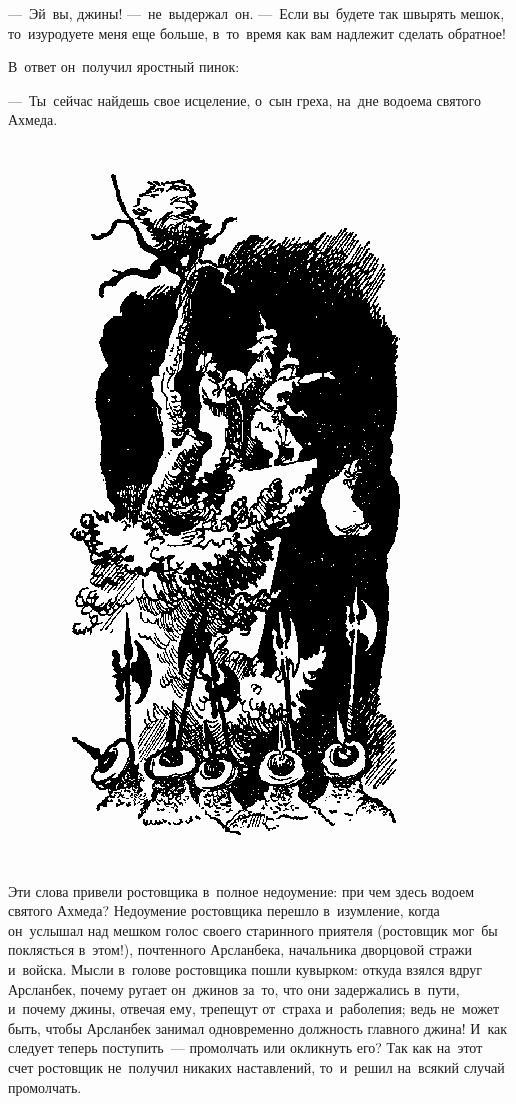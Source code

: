 \documentclass[12pt,a4paper]{book}
\begin{document}
—~Эй~вы, джины! —~не~выдержал~он. —~Если вы~будете так швырять мешок, то~изуродуете меня еще больше, в~то~время как вам надлежит сделать обратное!

В~ответ он~получил яростный пинок:

—~Ты~сейчас найдешь свое исцеление, о~сын греха, на~дне водоема святого Ахмеда.

\begin{figure}[p]
\centering
\includegraphics[scale=0.8]{21.png}
\end{figure}

Эти слова привели ростовщика в~полное недоумение: при чем здесь водоем святого Ахмеда? Недоумение ростовщика перешло в~изумление, когда он~услышал над мешком голос своего старинного приятеля (ростовщик мог~бы поклясться в~этом!), почтенного Арсланбека, начальника дворцовой стражи и~войска. Мысли в~голове ростовщика пошли кувырком: откуда взялся вдруг Арсланбек, почему ругает он~джинов за~то, что они задержались в~пути, и~почему джины, отвечая ему, трепещут от~страха и~раболепия; ведь не~может быть, чтобы Арсланбек занимал одновременно должность главного джина! И~как следует теперь поступить~— промолчать или окликнуть его? Так как на~этот счет ростовщик не~получил никаких наставлений, то~и~решил на~всякий случай промолчать.
\end{document}
